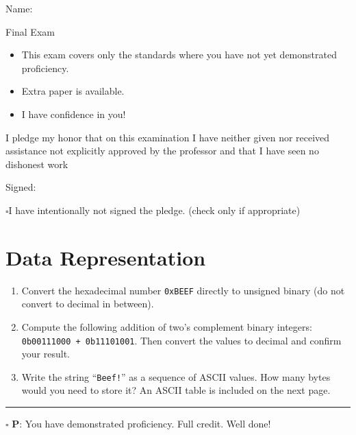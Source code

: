 \documentclass[12pt]{article}
\begin{document}
Name: \makebox[3in]{\hrulefill
\hrulefill}

\vfill

\begin{center}
{\huge Final Exam}
\end{center}

\begin{itemize}

    \item This exam covers only the standards where you have not yet demonstrated proficiency.
    \item Extra paper is available. 
    \item I have confidence in you!
\end{itemize}

\vfill

I pledge my honor that on this examination I have neither given nor received assistance not explicitly approved by the professor and that I have seen no dishonest work 

\hfill Signed: \makebox[3in]{\hrulefill}

$\square$\quad I have intentionally not signed the pledge. (check only if appropriate)
\newpage


\section*{Data Representation}

\begin{enumerate}
\item Convert the hexadecimal number \texttt{0xBEEF} directly to unsigned binary (do not convert to decimal in between).
\vfill

\item Compute the following addition of two's complement binary integers: \texttt{0b00111000 + 0b11101001}. Then convert the values to decimal and confirm your result.
\vfill

\item Write the string ``\texttt{Beef!}'' as a sequence of ASCII values. How many bytes would you need to store it? An ASCII table is included on the next page.
\vfill
\end{enumerate}

\vfill

\rule[1ex]{\textwidth}{.1pt}

$\square$ \textbf{P}: You have demonstrated proficiency. Full credit. Well done!
\end{document}
